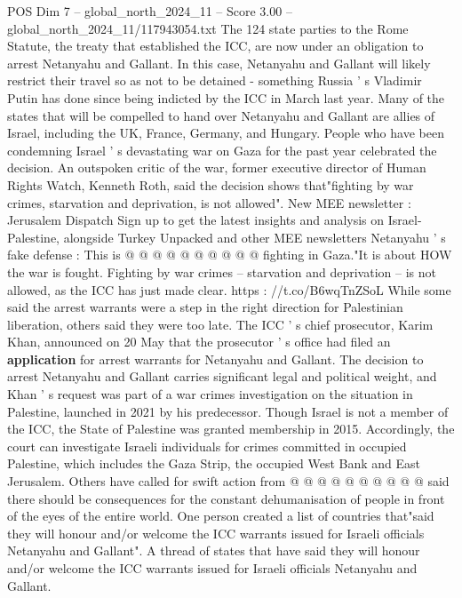 \begin{textsample}{POS Dim 7 – global\_north\_2024\_11 – Score 3.00 – global\_north\_2024\_11/117943054.txt}  \label{ex:f7_pos_191}
The 124 state parties to the Rome Statute, the treaty that established the ICC, are now under an obligation to arrest Netanyahu and Gallant.
In this case, Netanyahu and Gallant will likely restrict their travel so as not to be detained - something Russia ' s Vladimir Putin has done since being indicted by the ICC in March last year.
Many of the states that will be compelled to hand over Netanyahu and Gallant are allies of Israel, including the UK, France, Germany, and Hungary.
People who have been condemning Israel ' s devastating war on Gaza for the past year celebrated the decision.
An outspoken critic of the war, former executive director of Human Rights Watch, Kenneth Roth, said the decision shows that"fighting by war crimes, starvation and deprivation, is not allowed".
New MEE newsletter : Jerusalem Dispatch Sign up to get the latest insights and analysis on Israel-Palestine, alongside Turkey Unpacked and other MEE newsletters Netanyahu ' s fake defense : This is @ @ @ @ @ @ @ @ @ @ fighting in Gaza."It is about HOW the war is fought.
Fighting by war crimes -- starvation and deprivation -- is not allowed, as the ICC has just made clear. https : //t.co/B6wqTnZSoL While some said the arrest warrants were a step in the right direction for Palestinian liberation, others said they were too late.
The ICC ' s chief prosecutor, Karim Khan, announced on 20 May that the prosecutor ' s office had filed an \textbf{application} for arrest warrants for Netanyahu and Gallant.
The decision to arrest Netanyahu and Gallant carries significant legal and political weight, and Khan ' s request was part of a war crimes investigation on the situation in Palestine, launched in 2021 by his predecessor.
Though Israel is not a member of the ICC, the State of Palestine was granted membership in 2015.
Accordingly, the court can investigate Israeli individuals for crimes committed in occupied Palestine, which includes the Gaza Strip, the occupied West Bank and East Jerusalem.
Others have called for swift action from @ @ @ @ @ @ @ @ @ @ said there should be consequences for the constant dehumanisation of people in front of the eyes of the entire world.
One person created a list of countries that"said they will honour and/or welcome the ICC warrants issued for Israeli officials Netanyahu and Gallant".
A thread of states that have said they will honour and/or welcome the ICC warrants issued for Israeli officials Netanyahu and Gallant.

\end{textsample}
